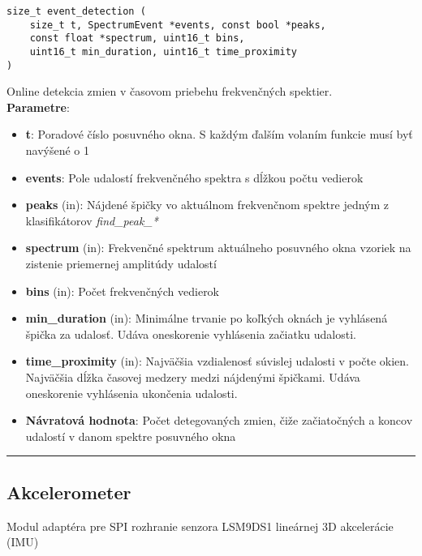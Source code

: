 \begin{lstlisting}[style=docs]
size_t event_detection (
	size_t t, SpectrumEvent *events, const bool *peaks, 
	const float *spectrum, uint16_t bins,
	uint16_t min_duration, uint16_t time_proximity
)
\end{lstlisting}
   Online detekcia zmien v časovom priebehu frekvenčných spektier. \\
\textbf{Parametre}:
\begin{itemize}[noitemsep, topsep=0pt]
\item \textbf{t}: Poradové číslo posuvného okna. S každým ďalším volaním funkcie musí byť navýšené o 1 
\item \textbf{events}: Pole udalostí frekvenčného spektra s dĺžkou počtu vedierok
\item \textbf{peaks} (in): Nájdené špičky vo aktuálnom frekvenčnom spektre jedným z klasifikátorov \emph{find\_peak\_*}
\item \textbf{spectrum} (in): Frekvenčné spektrum aktuálneho posuvného okna vzoriek na zistenie priemernej amplitúdy udalostí
\item \textbf{bins} (in): Počet frekvenčných vedierok
\item \textbf{min\_duration} (in): Minimálne trvanie po koľkých oknách je vyhlásená špička za udalosť. Udáva oneskorenie vyhlásenia začiatku udalosti.
\item \textbf{time\_proximity} (in): Najväčšia vzdialenosť súvislej udalosti v počte okien. Najväčšia dĺžka časovej medzery medzi nájdenými špičkami. Udáva oneskorenie vyhlásenia ukončenia udalosti.
 
\item \textbf{Návratová hodnota}: Počet detegovaných zmien, čiže začiatočných a koncov udalostí v danom spektre posuvného okna
\end{itemize}
\bigbreak
\hrule


\subsection{Akcelerometer} \label{modules:imu}
Modul adaptéra pre SPI rozhranie senzora LSM9DS1 lineárnej 3D akcelerácie (IMU)

